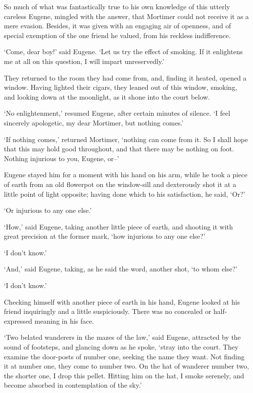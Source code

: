 So much of what was fantastically true to his own knowledge of this
utterly careless Eugene, mingled with the answer, that Mortimer could
not receive it as a mere evasion. Besides, it was given with an engaging
air of openness, and of special exemption of the one friend he valued,
from his reckless indifference.

‘Come, dear boy!’ said Eugene. ‘Let us try the effect of smoking. If it
enlightens me at all on this question, I will impart unreservedly.’

They returned to the room they had come from, and, finding it heated,
opened a window. Having lighted their cigars, they leaned out of this
window, smoking, and looking down at the moonlight, as it shone into the
court below.

‘No enlightenment,’ resumed Eugene, after certain minutes of silence. ‘I
feel sincerely apologetic, my dear Mortimer, but nothing comes.’

‘If nothing comes,’ returned Mortimer, ‘nothing can come from it. So
I shall hope that this may hold good throughout, and that there may be
nothing on foot. Nothing injurious to you, Eugene, or--’

Eugene stayed him for a moment with his hand on his arm, while he took a
piece of earth from an old flowerpot on the window-sill and dexterously
shot it at a little point of light opposite; having done which to his
satisfaction, he said, ‘Or?’

‘Or injurious to any one else.’

‘How,’ said Eugene, taking another little piece of earth, and shooting
it with great precision at the former mark, ‘how injurious to any one
else?’

‘I don’t know.’

‘And,’ said Eugene, taking, as he said the word, another shot, ‘to whom
else?’

‘I don’t know.’

Checking himself with another piece of earth in his hand, Eugene looked
at his friend inquiringly and a little suspiciously. There was no
concealed or half-expressed meaning in his face.

‘Two belated wanderers in the mazes of the law,’ said Eugene, attracted
by the sound of footsteps, and glancing down as he spoke, ‘stray into
the court. They examine the door-posts of number one, seeking the name
they want. Not finding it at number one, they come to number two. On the
hat of wanderer number two, the shorter one, I drop this pellet. Hitting
him on the hat, I smoke serenely, and become absorbed in contemplation
of the sky.’

